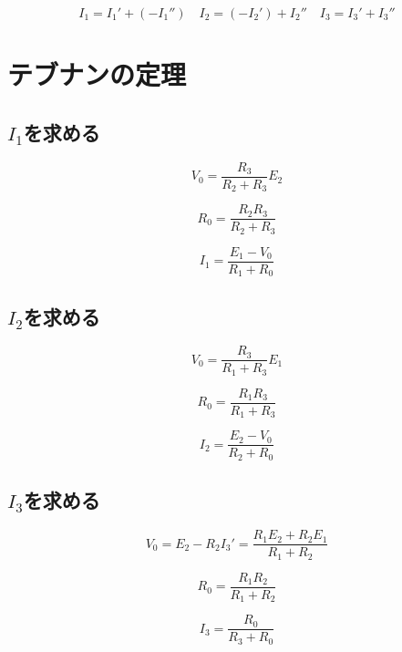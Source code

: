 \documentclass{article}
\begin{document}
\begin{equation}
    I_1 = I_1' + (-I_1'')  \quad I_2 = (-I_2') + I_2'' \quad I_3 = I_3' + I_3''
\end{equation}

\section{テブナンの定理}

\begin{center}
    \subsection{$I_1$を求める}
\end{center}

\begin{equation}
    V_0 = \frac{R_3}{R_2+R_3}E_2
\end{equation}

\begin{equation}
    R_0 = \frac{R_2R_3}{R_2+R_3} 
\end{equation}

\begin{equation}
    I_1 = \frac{E_1-V_0}{R_1+R_0}
\end{equation}

\begin{center}
    \subsection{$I_2$を求める}
\end{center}

\begin{equation}
    V_0 = \frac{R_3}{R_1+R_3}E_1
\end{equation}

\begin{equation}
    R_0 = \frac{R_1R_3}{R_1+R_3}
\end{equation}

\begin{equation}
    I_2 = \frac{E_2-V_0}{R_2+R_0}
\end{equation}

\begin{center}
    \subsection{$I_3$を求める}
\end{center}

\begin{equation}
    V_0 = E_2 - R_2I_3' = \frac{R_1E_2+R_2E_1}{R_1+R_2}
\end{equation}

\begin{equation}
    R_0 = \frac{R_1R_2}{R_1+R_2}
\end{equation}

\begin{equation}
    I_3 = \frac{R_0}{R_3+R_0}
\end{equation}
\end{document}
